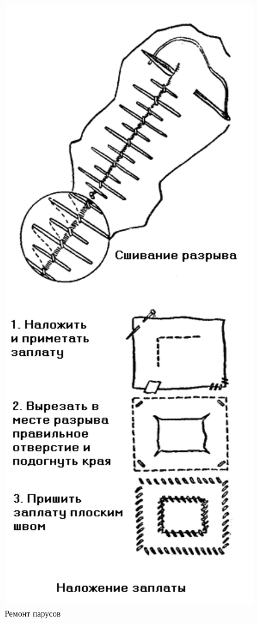 \documentclass[a4paper, 12pt, twoside, final]{scrbook}
\begin{document}
\begin{figure}[htbp]
	\hfil\hfil%
	\begin{minipage}[b]{0.49\textwidth}
		\centering\includegraphics[scale=1]{72_2_Remont_parusov}
	\end{minipage}
	\caption{Ремонт парусов}
	\label{fig:72}
\end{figure}
\end{document}
